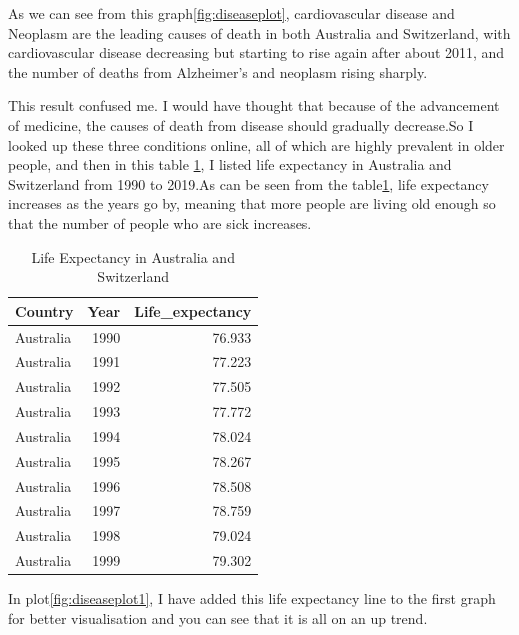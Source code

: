 \documentclass[11pt,a4paper,]{article}
\begin{document}
As we can see from this graph\ref{fig:diseaseplot}, cardiovascular disease and Neoplasm are the leading causes of death in both Australia and Switzerland, with cardiovascular disease decreasing but starting to rise again after about 2011, and the number of deaths from Alzheimer's and neoplasm rising sharply.

This result confused me. I would have thought that because of the advancement of medicine, the causes of death from disease should gradually decrease.So I looked up these three conditions online, all of which are highly prevalent in older people, and then in this table \ref{tab:lifeexpendcy}, I listed life expectancy in Australia and Switzerland from 1990 to 2019.As can be seen from the table\ref{tab:lifeexpendcy}, life expectancy increases as the years go by, meaning that more people are living old enough so that the number of people who are sick increases.

\begin{table}

\caption{\label{tab:lifeexpendcy}Life Expectancy in Australia and Switzerland}
\centering
\begin{tabular}[t]{l|r|r}
\hline
Country & Year & Life\_expectancy\\
\hline
Australia & 1990 & 76.933\\
\hline
Australia & 1991 & 77.223\\
\hline
Australia & 1992 & 77.505\\
\hline
Australia & 1993 & 77.772\\
\hline
Australia & 1994 & 78.024\\
\hline
Australia & 1995 & 78.267\\
\hline
Australia & 1996 & 78.508\\
\hline
Australia & 1997 & 78.759\\
\hline
Australia & 1998 & 79.024\\
\hline
Australia & 1999 & 79.302\\
\hline
\end{tabular}
\end{table}

In plot\ref{fig:diseaseplot1}, I have added this life expectancy line to the first graph for better visualisation and you can see that it is all on an up trend.
\end{document}
